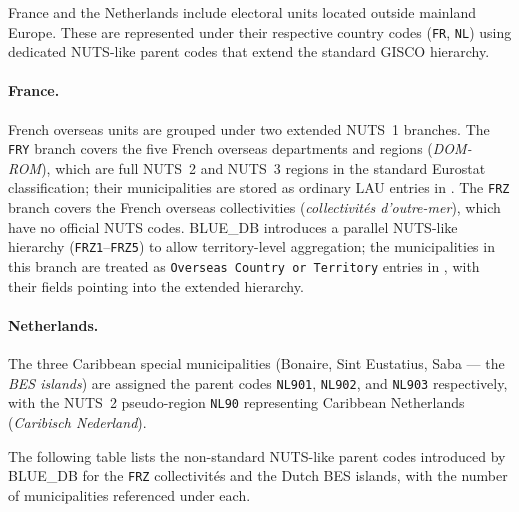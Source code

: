 France and the Netherlands include electoral units located outside mainland
Europe.  These are represented under their respective country codes
(\texttt{FR}, \texttt{NL}) using dedicated NUTS-like parent codes that extend
the standard GISCO hierarchy.

\paragraph{France.}
French overseas units are grouped under two extended NUTS~1 branches.
The \texttt{FRY} branch covers the five French overseas departments and regions
(\textit{DOM-ROM}), which are full NUTS~2 and NUTS~3 regions in the standard
Eurostat classification; their municipalities are stored as ordinary LAU entries
in .
The \texttt{FRZ} branch covers the French overseas collectivities
(\textit{collectivités d'outre-mer}), which have no official NUTS codes.
BLUE\_DB introduces a parallel NUTS-like hierarchy (\texttt{FRZ1}--\texttt{FRZ5})
to allow territory-level aggregation; the municipalities in this branch are
treated as \texttt{Overseas Country or Territory} entries in
, with their  fields pointing into
the extended hierarchy.

\paragraph{Netherlands.}
The three Caribbean special municipalities (Bonaire, Sint Eustatius, Saba ---
the \textit{BES islands}) are assigned the parent codes \texttt{NL901},
\texttt{NL902}, and \texttt{NL903} respectively, with the  NUTS~2
pseudo-region \texttt{NL90} representing Caribbean Netherlands (\emph{Caribisch Nederland}).

The following table lists the non-standard NUTS-like parent codes introduced
by BLUE\_DB for the \texttt{FRZ} collectivités and the Dutch BES islands,
with the number of municipalities referenced under each.
